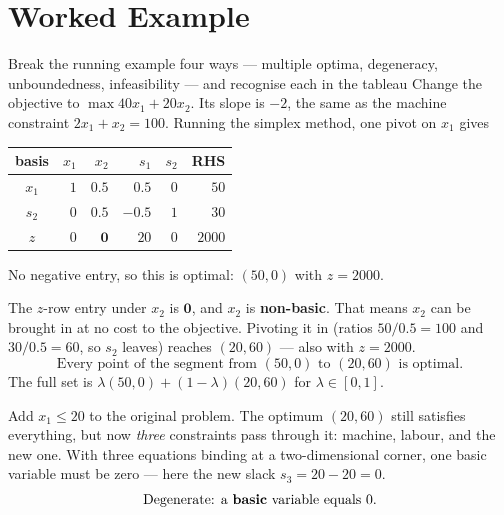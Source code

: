 \section{Worked Example}

\begin{worked}{Break the running example four ways --- multiple optima, degeneracy, unboundedness, infeasibility --- and recognise each in the tableau}
Change the objective to $\max 40x_{1}+20x_{2}$. Its slope is $-2$, the same
as the machine constraint $2x_{1}+x_{2}=100$. Running the simplex method,
one pivot on $x_{1}$ gives
\begin{center}\footnotesize
\begin{tabular}{c|rrrr|r}
  \hline
  basis & $x_{1}$ & $x_{2}$ & $s_{1}$ & $s_{2}$ & RHS\\
  \hline
  $x_{1}$ & $1$ & $0.5$ & $0.5$ & $0$ & $50$\\
  $s_{2}$ & $0$ & $0.5$ & $-0.5$ & $1$ & $30$\\
  \hline
  $z$ & $0$ & $\mathbf 0$ & $20$ & $0$ & $2000$\\
  \hline
\end{tabular}
\end{center}
No negative entry, so this is optimal: $(50,0)$ with $z=2000$.

The $z$-row entry under $x_{2}$ is $\mathbf 0$, and $x_{2}$ is
\textbf{non-basic}. That means $x_{2}$ can be brought in at no cost to the
objective. Pivoting it in (ratios $50/0.5=100$ and $30/0.5=60$, so $s_{2}$
leaves) reaches $(20,60)$ --- also with $z=2000$.
\[
  \boxed{\text{Every point of the segment from }(50,0)\text{ to }(20,60)\text{ is optimal.}}
\]
The full set is $\lambda(50,0)+(1-\lambda)(20,60)$ for $\lambda\in[0,1]$.

Add $x_{1}\le20$ to the original problem. The optimum $(20,60)$ still
satisfies everything, but now \emph{three} constraints pass through it:
machine, labour, and the new one. With three equations binding at a
two-dimensional corner, one basic variable must be zero --- here the new
slack $s_{3}=20-20=0$.
\[
  \text{Degenerate: a \textbf{basic} variable equals }0 .
\]


\end{worked}
